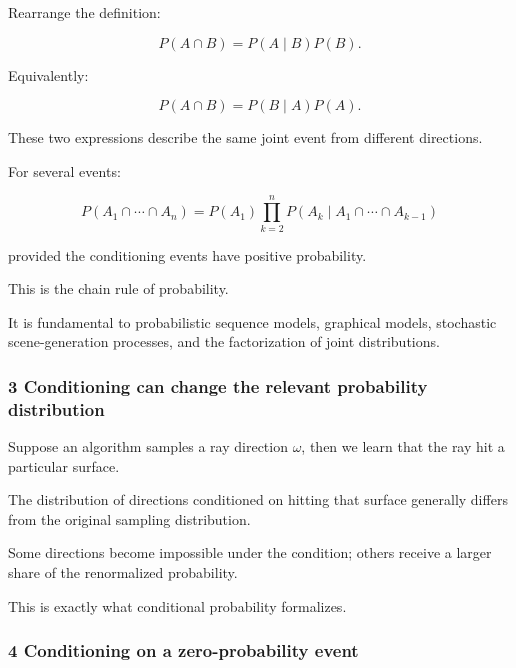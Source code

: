 \hypertarget{02-foundations-ii-ch023-the-multiplication-rule}{}

Rearrange the definition:

\[
 P(A\cap B) = P(A\mid B)P(B).
\]

Equivalently:

\[
 \boxed{ P(A\cap B) = P(B\mid A)P(A) }.
\]

These two expressions describe the same joint event from different directions.

For several events:

\[
 \boxed{ P(A_1\cap\cdots\cap A_n) = P(A_1) \prod_{k=2}^{n} P(A_k\mid A_1\cap\cdots\cap A_{k-1}) }
\]

provided the conditioning events have positive probability.

This is the chain rule of probability.

It is fundamental to probabilistic sequence models, graphical models, stochastic scene-generation processes, and the factorization of joint distributions.

\subsubsection{3 Conditioning can change the relevant probability distribution}\label{02-foundations-ii-ch023-conditioning-can-change-the-relevant-probability-distribution}

\hypertarget{02-foundations-ii-ch023-conditioning-can-change-the-relevant-probability-distribution}{}

Suppose an algorithm samples a ray direction \(\omega\), then we learn that the ray hit a particular surface.

The distribution of directions conditioned on hitting that surface generally differs from the original sampling distribution.

Some directions become impossible under the condition; others receive a larger share of the renormalized probability.

This is exactly what conditional probability formalizes.

\subsubsection{4 Conditioning on a zero-probability event}\label{02-foundations-ii-ch023-conditioning-on-a-zero-probability-event}

\hypertarget{02-foundations-ii-ch023-conditioning-on-a-zero-probability-event}{}

